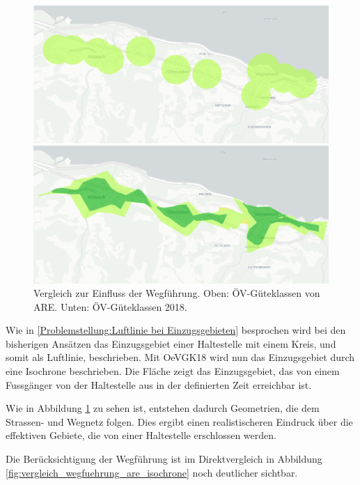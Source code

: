 \begin{figure}[ht]
    \centering
    \includegraphics[width=0.8\linewidth]{technicalreport/img/vergleich_wegfuehrung}
    \caption[Vergleich zur Einfluss der Wegführung]{Vergleich zur Einfluss der Wegführung. Oben: ÖV-Güteklassen von \ac{ARE}. Unten: ÖV-Güteklassen 2018.}
    \label{fig:vergleich_wegfuehrung}
\end{figure}

Wie in \ref{Problemstellung:Luftlinie bei Einzugsgebieten} besprochen wird bei den bisherigen Ansätzen das Einzugsgebiet einer Haltestelle mit einem Kreis, und somit als Luftlinie, beschrieben.
Mit \gls{OeVGK18} wird nun das Einzugsgebiet durch eine \gls{Isochrone} beschrieben.
Die Fläche zeigt das Einzugsgebiet, das von einem Fussgänger von der Haltestelle aus in der definierten Zeit erreichbar ist.

Wie in Abbildung \ref{fig:vergleich_wegfuehrung} zu sehen ist, entstehen dadurch Geometrien, die dem Strassen- und Wegnetz folgen.
Dies ergibt einen realistischeren Eindruck über die effektiven Gebiete, die von einer Haltestelle erschlossen werden.

Die Berücksichtigung der Wegführung ist im Direktvergleich in Abbildung \ref{fig:vergleich_wegfuehrung_are_isochrone} noch deutlicher sichtbar.

